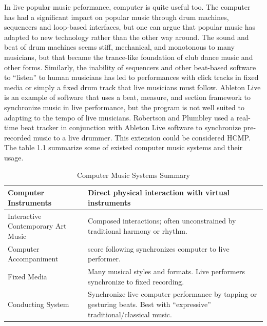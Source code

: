 In live popular music peformance, computer is quite useful too.
The computer has had a significant
impact on popular music through drum machines, sequencers and loop-based
interfaces, but one can argue that popular music has adapted to new technology
rather than the other way around. The sound and beat of drum machines seems stiff,
mechanical, and monotonous to many musicians, but that became the trance-like
foundation of club dance music and other forms. Similarly, the inability of
sequencers and other beat-based software to “listen” to human musicians has led to
performances with click tracks in fixed media or simply a fixed drum track that live
musicians must follow. Ableton Live is an example of software that
uses a beat, measure, and section framework to synchronize music in live
performance, but the program is not well suited to adapting to the tempo of live
musicians. Robertson and Plumbley used a real-time beat tracker in
conjunction with Ableton Live software to synchronize pre-recorded music 
to a live drummer. This extension could be considered HCMP.
The table 1.1 summarize some of existed computer music systems and their usage.

\begin{table}[htdp]
\centering
\begin{tabular}{| p{5cm} | p{8cm} |} %

\hline
Computer Instruments & Direct physical interaction with virtual instruments \\

\hline 
Interactive Contemporary Art Music & Composed interactions; often unconstrained by
traditional harmony or rhythm.\\

\hline
Computer Accompaniment & score following synchronizes computer to live performer.\\

\hline
Fixed Media  & Many musical styles and formats. Live performers
synchronize to fixed recording.\\

\hline
Conducting System & Synchronize live computer performance by tapping or
gesturing beats. Best with “expressive”
traditional/classical music.\\
\hline
\end{tabular}
\caption[Computer Music Systems Summary]{Computer Music Systems Summary}
\label{latexin_genes} %
\end{table}


